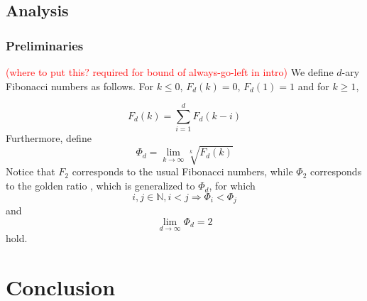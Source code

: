 \documentclass[a4paper,12pt]{article}
\newcommand\todo[1]{\textcolor{red}{(#1)}}
\begin{document}
\subsection{Analysis}
\label{sec:analysis}

\subsubsection{Preliminaries}
\label{sec:preliminaries}
\todo{where to put this? required for  bound of always-go-left in intro}
We define $d$-ary Fibonacci numbers as follows. For $k \leq0$, $F_d(k) = 0$, $F_d(1) = 1$ and for $k \geq 1$,

\[
F_d(k) = \sum_{i=1}^{d}F_d(k-i)
\]
Furthermore, define 
\[
\Phi_d = \lim_{k \rightarrow \infty} \sqrt[k]{F_d(k)}
\]
Notice that $F_2$ corresponds to the usual Fibonacci numbers, while $\Phi_2 $ corresponds to the golden ratio \cite{Knuth73}, which is generalized to $\Phi_d$, for which 
\[
i, j \in \mathbb{N}, i < j \Rightarrow \Phi_i < \Phi_j
\]
and 
\[
\lim_{d\rightarrow \infty} \Phi_d = 2
\]
hold.

\section{Conclusion}
\label{sec:conclusion}


 
\end{document}
